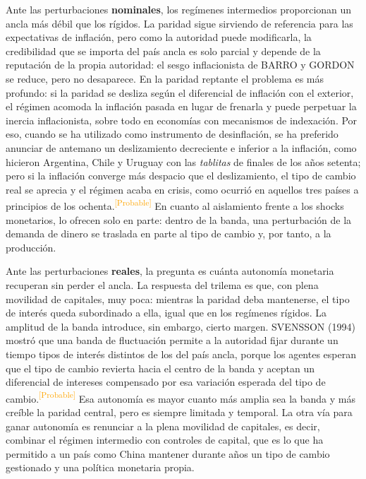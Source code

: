 \documentclass[10pt,a4paper]{article}
\begin{document}
Ante las perturbaciones \textbf{nominales}, los regímenes intermedios proporcionan un ancla más débil que los rígidos. La paridad sigue sirviendo de referencia para las expectativas de inflación, pero como la autoridad puede modificarla, la credibilidad que se importa del país ancla es solo parcial y depende de la reputación de la propia autoridad: el sesgo inflacionista de BARRO y GORDON se reduce, pero no desaparece. En la paridad reptante el problema es más profundo: si la paridad se desliza según el diferencial de inflación con el exterior, el régimen acomoda la inflación pasada en lugar de frenarla y puede perpetuar la inercia inflacionista, sobre todo en economías con mecanismos de indexación. Por eso, cuando se ha utilizado como instrumento de desinflación, se ha preferido anunciar de antemano un deslizamiento decreciente e inferior a la inflación, como hicieron Argentina, Chile y Uruguay con las \textit{tablitas} de finales de los años setenta; pero si la inflación converge más despacio que el deslizamiento, el tipo de cambio real se aprecia y el régimen acaba en crisis, como ocurrió en aquellos tres países a principios de los ochenta.\textcolor{orange}{\textsuperscript{[Probable]}} En cuanto al aislamiento frente a los shocks monetarios, lo ofrecen solo en parte: dentro de la banda, una perturbación de la demanda de dinero se traslada en parte al tipo de cambio y, por tanto, a la producción.

Ante las perturbaciones \textbf{reales}, la pregunta es cuánta autonomía monetaria recuperan sin perder el ancla. La respuesta del trilema es que, con plena movilidad de capitales, muy poca: mientras la paridad deba mantenerse, el tipo de interés queda subordinado a ella, igual que en los regímenes rígidos. La amplitud de la banda introduce, sin embargo, cierto margen. SVENSSON (1994) mostró que una banda de fluctuación permite a la autoridad fijar durante un tiempo tipos de interés distintos de los del país ancla, porque los agentes esperan que el tipo de cambio revierta hacia el centro de la banda y aceptan un diferencial de intereses compensado por esa variación esperada del tipo de cambio.\textcolor{orange}{\textsuperscript{[Probable]}} Esa autonomía es mayor cuanto más amplia sea la banda y más creíble la paridad central, pero es siempre limitada y temporal. La otra vía para ganar autonomía es renunciar a la plena movilidad de capitales, es decir, combinar el régimen intermedio con controles de capital, que es lo que ha permitido a un país como China mantener durante años un tipo de cambio gestionado y una política monetaria propia.
\end{document}
